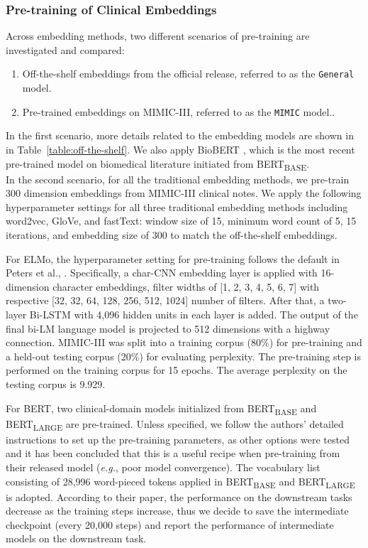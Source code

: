 \documentclass[11pt,a4paper]{article}
\begin{document}
\subsubsection{Pre-training of Clinical Embeddings}
Across embedding methods, two different scenarios of pre-training are investigated and compared: 

\begin{enumerate}
\item Off-the-shelf embeddings from the official release, referred to as the \verb|General| model. 
\item Pre-trained embeddings on MIMIC-III, referred to as the \verb|MIMIC| model..
\end{enumerate}

In the first scenario, more details related to the embedding models are shown in in Table~\ref{table:off-the-shelf}. We also apply BioBERT \cite{lee2019biobert}, which is the most recent pre-trained model on biomedical literature initiated from BERT\textsubscript{BASE}. 
\\

In the second scenario, for all the traditional embedding methods, we pre-train 300 dimension embeddings from MIMIC-III clinical notes.  We apply the following hyperparameter settings for all three traditional embedding methods including word2vec, GloVe, and fastText: window size of 15, minimum word count of 5, 15 iterations, and embedding size of 300 to match the off-the-shelf embeddings.

For ELMo, the hyperparameter setting for pre-training follows the default in Peters et al., . Specifically, a char-CNN embedding layer is applied with 16-dimension character embeddings, filter widths of [1, 2, 3, 4, 5, 6, 7] with respective [32, 32, 64, 128, 256, 512, 1024] number of filters. After that, a two-layer Bi-LSTM with 4,096 hidden units in each layer is added. The output of the final bi-LM language model is projected to 512 dimensions with a highway connection. MIMIC-III was split into a training corpus (80\%) for pre-training and a held-out testing corpus (20\%) for evaluating perplexity. The pre-training step is performed on the training corpus for 15 epochs. The average perplexity on the testing corpus is 9.929.

For BERT, two clinical-domain models initialized from BERT\textsubscript{BASE} and BERT\textsubscript{LARGE} are pre-trained. Unless specified, we follow the authors’ detailed instructions to set up the pre-training parameters, as other options were tested and it has been concluded that this is a useful recipe when pre-training from their released model (\emph{e.g.}, poor model convergence). The vocabulary list consisting of 28,996 word-pieced tokens applied in BERT\textsubscript{BASE} and BERT\textsubscript{LARGE} is adopted.  According to their paper, the performance on the downstream tasks decrease as the training steps increase, thus we decide to save the intermediate checkpoint (every 20,000 steps) and report the performance of intermediate models on the downstream task. 
\end{document}
